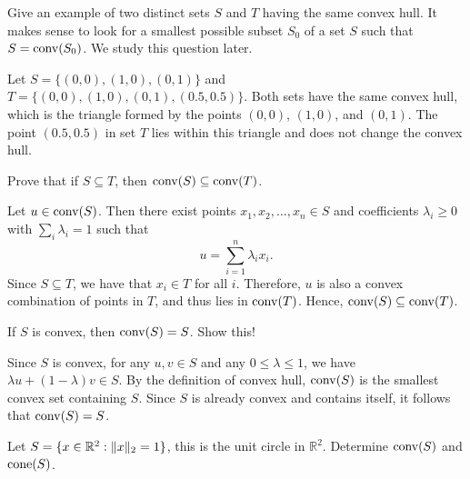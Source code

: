 \begin{exercise}
  Give an example of two distinct sets $S$ and $T$ having the same convex hull.
  It makes sense to look for a smallest possible subset $S_0$ of a set $S$ such that $S = \operatorname*{conv}(S_0)$.
  We study this question later.
\end{exercise}

\begin{solution}
  Let $S = \{(0, 0), (1, 0), (0, 1)\}$ and $T = \{(0, 0), (1, 0), (0, 1), (0.5, 0.5)\}$.
  Both sets have the same convex hull, which is the triangle formed by the points $(0, 0)$, $(1, 0)$, and $(0, 1)$.
  The point $(0.5, 0.5)$ in set $T$ lies within this triangle and does not change the convex hull.
\end{solution}

\begin{exercise}
  Prove that if $S \subseteq T$, then $\operatorname*{conv}(S) \subseteq \operatorname*{conv}(T)$.
\end{exercise}

\begin{solution}
  Let $u \in \operatorname*{conv}(S)$.
  Then there exist points $x_1, x_2, \ldots, x_n \in S$ and coefficients $\lambda_i \geq 0$ with $\sum_i \lambda_i = 1$ such that
  \begin{equation}
    u = \sum_{i=1}^n \lambda_i x_i.
  \end{equation}
  Since $S \subseteq T$, we have that $x_i \in T$ for all $i$.
  Therefore, $u$ is also a convex combination of points in $T$, and thus lies in $\operatorname*{conv}(T)$.
  Hence, $\operatorname*{conv}(S) \subseteq \operatorname*{conv}(T)$.
\end{solution}

\begin{exercise}
  If $S$ is convex, then $\operatorname*{conv}(S) = S$.
  Show this!
\end{exercise}

\begin{solution}
  Since $S$ is convex, for any $u, v \in S$ and any $0 \leq \lambda \leq 1$, we have $\lambda u + (1 - \lambda) v \in S$.
  By the definition of convex hull, $\operatorname*{conv}(S)$ is the smallest convex set containing $S$.
  Since $S$ is already convex and contains itself, it follows that $\operatorname*{conv}(S) = S$.
\end{solution}

\begin{exercise}
  Let $S = \{ x \in \mathbb{R}^2 : \lVert x\rVert_2 = 1 \}$, this is the unit circle in $\mathbb{R}^2$.
  Determine $\operatorname*{conv}(S)$ and $\operatorname*{cone}(S)$.
\end{exercise}

